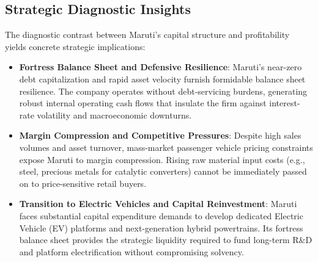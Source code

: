 \subsection{Strategic Diagnostic Insights}
\label{sec:strategic_insights}
The diagnostic contrast between Maruti's capital structure and profitability yields concrete strategic implications:
\begin{itemize}
    \item \textbf{Fortress Balance Sheet and Defensive Resilience}: Maruti's near-zero debt capitalization and rapid asset velocity furnish formidable balance sheet resilience. The company operates without debt-servicing burdens, generating robust internal operating cash flows that insulate the firm against interest-rate volatility and macroeconomic downturns.
    \item \textbf{Margin Compression and Competitive Pressures}: Despite high sales volumes and asset turnover, mass-market passenger vehicle pricing constraints expose Maruti to margin compression. Rising raw material input costs (e.g., steel, precious metals for catalytic converters) cannot be immediately passed on to price-sensitive retail buyers.
    \item \textbf{Transition to Electric Vehicles and Capital Reinvestment}: Maruti faces substantial capital expenditure demands to develop dedicated Electric Vehicle (EV) platforms and next-generation hybrid powertrains. Its fortress balance sheet provides the strategic liquidity required to fund long-term R\&D and platform electrification without compromising solvency.
\end{itemize}

